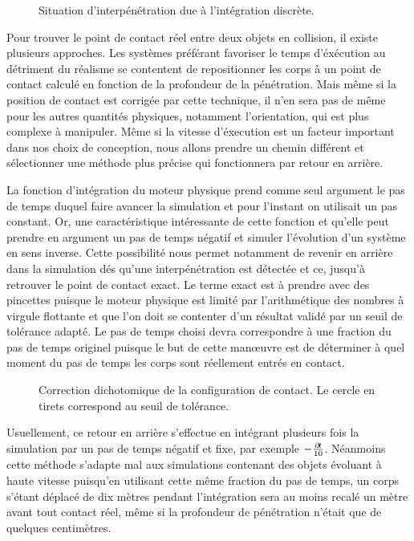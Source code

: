 \begin{figure}
  \centering
  
  \caption{Situation d'interpénétration due à l'intégration discrète.}
  \label{interpenetration}
\end{figure}

Pour trouver le point de contact réel entre deux objets en collision,
il existe plusieurs approches. Les systèmes préférant favoriser le
temps d'éxécution au détriment du réalisme se contentent de
repositionner les corps à un point de contact calculé en fonction de
la profondeur de la pénétration. Mais même si la position de contact
est corrigée par cette technique, il n'en sera pas de même pour les
autres quantités physiques, notamment l'orientation, qui est plus
complexe à manipuler. Même si la vitesse d'éxecution est un facteur
important dans nos choix de conception, nous allons prendre un chemin
différent et sélectionner une méthode plus précise qui fonctionnera
par retour en arrière.

La fonction d'intégration du moteur physique prend comme seul argument
le pas de temps duquel faire avancer la simulation et pour l'instant
on utilisait un pas constant. Or, une caractéristique intéressante de
cette fonction et qu'elle peut prendre en argument un pas de temps
négatif et simuler l'évolution d'un système en sens inverse. Cette
possibilité nous permet notamment de revenir en arrière dans la
simulation dés qu'une interpénétration est détectée et ce, jusqu'à
retrouver le point de contact exact. Le terme \og exact \fg{} est à
prendre avec des pincettes puisque le moteur physique est limité par
l'arithmétique des nombres à virgule flottante et que l'on doit se
contenter d'un résultat validé par un seuil de tolérance adapté. Le
pas de temps choisi devra correspondre à une fraction du pas de temps
originel puisque le but de cette man\oe uvre est de déterminer à quel
moment du pas de temps les corps sont réellement entrés en contact.

\begin{figure}[h]
  \centering
  
  \caption{Correction dichotomique de la configuration de contact. Le cercle en tirets correspond au seuil de tolérance.}
  \label{dichotomie}
\end{figure}

Usuellement, ce retour en arrière s'effectue en intégrant plusieurs
fois la simulation par un pas de temps négatif et fixe, par exemple
$-\frac{\partial \! t}{10}$. Néanmoins cette méthode s'adapte mal aux
simulations contenant des objets évoluant à haute vitesse puisqu'en
utilisant cette même fraction du pas de temps, un corps s'étant
déplacé de dix mètres pendant l'intégration sera au moins recalé un
mètre avant tout contact réel, même si la profondeur de pénétration
n'était que de quelques centimètres.

